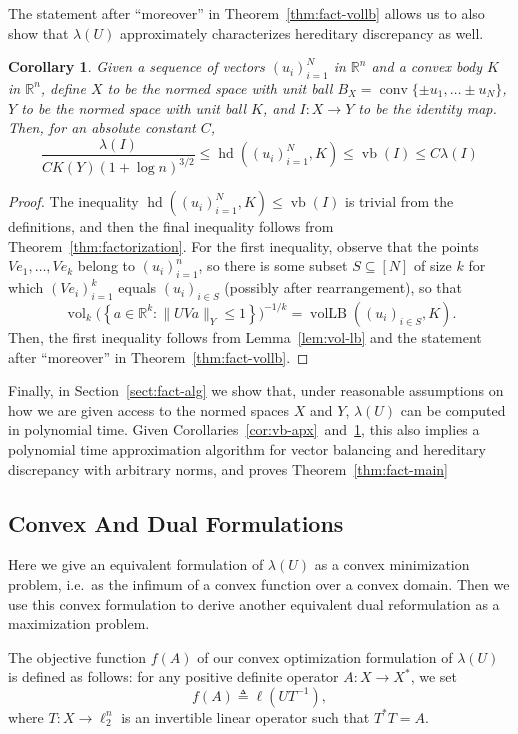 \documentclass[11pt]{article}
\newtheorem{corollary}[theorem]{Corollary}
\newcommand{\R}{{\mathbb{R}}}
\newcommand{\eqdef}{\triangleq}
\newcommand{\set}[1]{\left\{ #1 \right\}}
\DeclareMathOperator{\vollb}{volLB}
\DeclareMathOperator{\hd}{hd}
\DeclareMathOperator{\vb}{vb}
\DeclareMathOperator{\vol}{vol}
\DeclareMathOperator{\conv}{conv}
\begin{document}
The statement after ``moreover'' in Theorem~\ref{thm:fact-vollb}
allows us to also show that $\lambda(U)$ approximately characterizes
hereditary discrepancy as well.
\begin{corollary}\label{cor:hd-apx}
  Given a sequence of vectors $(u_i)_{i = 1}^N$ in $\R^n$ and a convex
  body $K$ in $\R^n$, define $X$ to be the normed space with
  unit ball $B_X = \conv\{\pm u_1, \ldots \pm u_N\}$, $Y$ to be
  the normed space with unit ball $K$, and $I:X \to Y$ to be the
  identity map. Then, for an absolute constant $C$,
  \[
  \frac{\lambda(I)}{C K(Y) (1 + \log n)^{3/2}} 
  \le \hd((u_i)_{i = 1}^N, K) \le \vb(I) 
  \le C \lambda(I)
  \]
\end{corollary}
\begin{proof}
 The inequality $\hd((u_i)_{i = 1}^N, K) \le \vb(I)$ is trivial from
 the definitions, and then the final inequality follows from
 Theorem~\ref{thm:factorization}. For the first inequality, observe
 that the points $Ve_1, \ldots, Ve_k$ belong to $(u_i)_{i = 1}^n$, so
 there is some subset $S \subseteq [N]$ of size $k$ for which
 $(Ve_i)_{i = 1}^k$ equals $(u_i)_{i \in S}$ (possibly after
 rearrangement), so that 
 \[
 \vol_k\bigl(\set{a \in \R^k: \|UV a\|_Y \le 1}\bigr)^{-1/k} =
 \vollb((u_i)_{i \in S}, K).
 \]
 Then, the first inequality follows from Lemma~\ref{lem:vol-lb} and
 the statement after ``moreover'' in Theorem~\ref{thm:fact-vollb}.
\end{proof}

Finally, in Section~\ref{sect:fact-alg} we show that, under reasonable
assumptions on how we are given access to the normed spaces $X$ and
$Y$, $\lambda(U)$ can be computed in polynomial time. Given
Corollaries~\ref{cor:vb-apx}~and~\ref{cor:hd-apx}, this also implies a
polynomial time approximation algorithm for vector balancing and
hereditary discrepancy with arbitrary norms, and proves Theorem~\ref{thm:fact-main}

\subsection{Convex And Dual Formulations}
\label{sect:fact-conv}

Here we give an equivalent formulation of $\lambda(U)$ as a convex
minimization problem, i.e.~as the infimum of a convex function over a
convex domain. Then we use this convex formulation to derive another
equivalent dual reformulation as a maximization problem.


The objective function $f(A)$ of our convex optimization formulation of
$\lambda(U)$ is defined as follows: for any positive definite
operator $A:X \to X^*$, we set
\begin{equation}
  \label{eq:obj-def}
  f(A) \eqdef \ell(UT^{-1}),
\end{equation}
where $T:X \to \ell_2^n$ is an invertible linear operator such that $T^*T = A$. 
\end{document}
